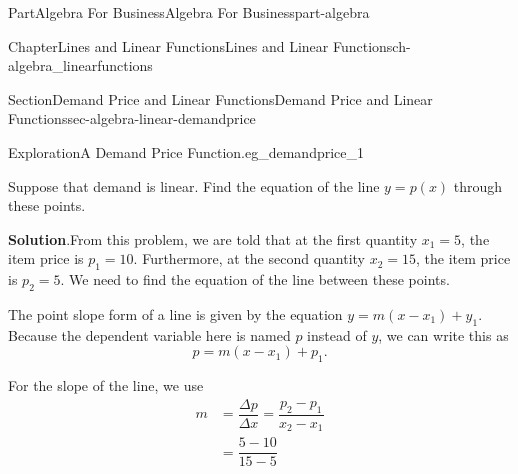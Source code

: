 \documentclass{tufte-book}
\newcommand{\blocktitlefont}{\relax}
\numberwithin{equation}{chapter}
\newcommand{\amp}{&}
\begin{document}
\begin{partptx}{Part}{Algebra For Business}{}{Algebra For Business}{}{}{part-algebra}
\begin{chapterptx}{Chapter}{Lines and Linear Functions}{}{Lines and Linear Functions}{}{}{ch-algebra_linearfunctions}
\begin{sectionptx}{Section}{Demand Price and Linear Functions}{}{Demand Price and Linear Functions}{}{}{sec-algebra-linear-demandprice}
\begin{exploration}{Exploration}{A Demand Price Function.}{eg_demandprice_1}
\begin{image}{0}{1}{0}{}
{
}%
\end{image}%
Suppose that demand is linear. Find the equation of the line \(y = p(x)\)  through these points.%
\par\smallskip%
\noindent\textbf{\blocktitlefont Solution}.\hypertarget{eg_demandprice_1-3}{}\quad{}From this problem, we are told that at the first quantity \(x_1=5\), the item price is \(p_1 = 10\).  Furthermore, at the second quantity \(x_2=15\), the item price is \(p_2=5\).  We need to find the equation of the line between these points.%
\par
The point slope form of a line is given by the equation \(y = m (x-x_1) + y_1\). Because the dependent variable here is named \(p\) instead of \(y\), we can write this as%
\begin{equation*}
p = m (x- x_1) + p_1\text{.}
\end{equation*}
%
\par
For the slope of the line, we use%
\begin{align*}
m \amp = \dfrac{\Delta p}{\Delta x} = \dfrac{p_2-p_1}{x_2-x_1}\\
\amp = \dfrac{5-10}{15-5}\\

\end{align*}
\end{exploration}
\end{sectionptx}
\end{chapterptx}
\end{partptx}
\end{document}
